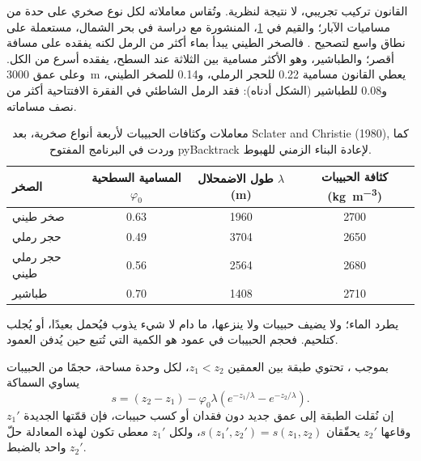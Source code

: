 القانون تركيب تجريبي، لا نتيجة لنظرية. وتُقاس معاملاته لكل نوع صخري على حدة من مساميات الآبار؛ والقيم في \cref{tab:b1:diagenesis-basins:athy}، المنشورة مع دراسة  في بحر الشمال، مستعملة على نطاق واسع لتصحيح . فالصخر الطيني يبدأ بماء أكثر من الرمل لكنه يفقده على مسافة أقصر؛ والطباشير، وهو الأكثر مسامية بين الثلاثة عند السطح، يفقده أسرع من الكل. وعلى عمق \qty{3000}{m} يعطي القانون مسامية \num{0.22} للحجر الرملي، و\num{0.14} للصخر الطيني، و\num{0.08} للطباشير (الشكل أدناه): فقد الرمل الشاطئي في الفقرة الافتتاحية أكثر من نصف مساماته.

\begin{table}[htbp]
\centering
\begin{tabular}{lccc}
\hline
الصخر & المسامية السطحية $\varphi_0$ & طول الاضمحلال $\lambda$ (m) & كثافة الحبيبات (\unit{kg.m^{-3}}) \\
\hline
صخر طيني            & 0.63 & 1960 & 2700 \\
حجر رملي        & 0.49 & 3704 & 2650 \\
حجر رملي طيني  & 0.56 & 2564 & 2680 \\
طباشير            & 0.70 & 1408 & 2710 \\
\hline
\end{tabular}
\caption{معاملات  وكثافات الحبيبات لأربعة أنواع صخرية، بعد Sclater and Christie (1980), كما وردت في البرنامج المفتوح pyBacktrack لإعادة البناء الزمني للهبوط.}
\label{tab:b1:diagenesis-basins:athy}
\end{table}

يطرد  الماء؛ ولا يضيف حبيبات ولا ينزعها، ما دام لا شيء يذوب فيُحمل بعيدًا، أو يُجلب كتلحيم. فحجم الحبيبات في عمود هو الكمية التي تُتبع حين يُدفن العمود.

\begin{proposition}\label{prop:b1:diagenesis-basins:solid}
بموجب ، تحتوي طبقة بين العمقين $z_1 < z_2$، لكل وحدة مساحة، حجمًا من الحبيبات يساوي السماكة
\[
  s = (z_2 - z_1) - \varphi_0 \lambda \left( e^{-z_1/\lambda} - e^{-z_2/\lambda} \right).
\]
إن نُقلت الطبقة إلى عمق جديد دون فقدان أو كسب حبيبات، فإن قمّتها الجديدة $z_1'$ وقاعها $z_2'$ يحقّقان $s(z_1', z_2') = s(z_1, z_2)$، ولكل $z_1'$ معطى تكون لهذه المعادلة حلّ واحد بالضبط $z_2'$.
\end{proposition}

